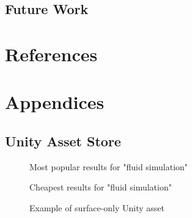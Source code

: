 \documentclass[12pt]{article}
\newcommand{\wideimage}[2][]{%
  \makebox[\textwidth][c]{\texttt{[image: \#2]}}%
}
\begin{document}
    \subsection{Future Work}

    \newpage
    \section{References}
    

    \newpage
    \section{Appendices}

    \subsection{Unity Asset Store}

    \begin{figure}[H]
        \noindent\wideimage[]{unityStore1.png}
        \caption{Most popular results for "fluid simulation" \cite{unityasset}}
    \end{figure}

    \begin{figure}[H]
        \noindent\wideimage[]{unityStore2.png}
        \caption{Cheapest results for "fluid simulation" \cite{unityasset}}
    \end{figure}

    \begin{figure}[H]
        \noindent\wideimage[]{stylizedWaterURP.png}
        \caption{Example of surface-only Unity asset \cite{stylized}}
    \end{figure}
\end{document}
